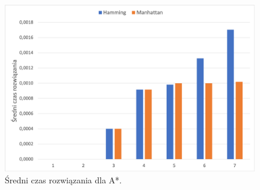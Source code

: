 \documentclass{classrep}
\begin{document}
\newpage
\begin{figure}		
	\includegraphics[width=11cm]{AStar/AStar_czas}
	\centering
	\captionsetup{name=Wykres}
	\caption{Średni czas rozwiązania dla A*.}
\end{figure}
\end{document}
